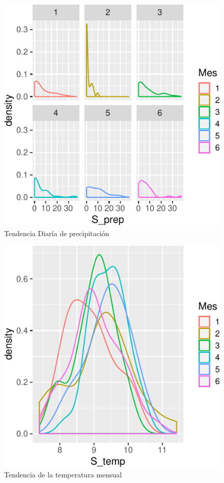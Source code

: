 \documentclass[letterpaper,9pt,twocolumn,twoside,]{pinp}
\begin{document}
\begin{figure}

{\centering \includegraphics{report_hidrolgy_files/figure-latex/unnamed-chunk-2-1} 

}

\caption{Tendencia Diaría de precipitación}\label{fig:unnamed-chunk-2}
\end{figure}

\begin{figure}

{\centering \includegraphics{report_hidrolgy_files/figure-latex/unnamed-chunk-3-1} 

}

\caption{Tendencia de la temperatura mensual}\label{fig:unnamed-chunk-3}
\end{figure}
\end{document}
